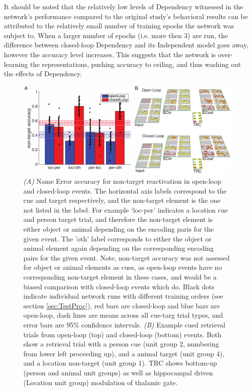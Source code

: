 \documentclass[11pt, titlepage, twoside]{article}
\begin{document}
It should be noted that the relatively low levels of Dependency witnessed in the network's performance compared to the original study's behavioral results %
can be attributed to the relatively small number of training epochs the network was subject to.  When a larger number of epochs (i.e. more then 3) are run, the difference between closed-loop Dependency and its Independent model goes away, however the accuracy level increases.  This suggests that the network is over-learning the representations, pushing accuracy to ceiling, and thus washing out the effects of Dependency.



\begin{figure}
    \begin{center}
	\includegraphics[width=\textwidth]{figs/depNonTarg.pdf}
    \end{center}
      \caption[Non Target Reactivation]{
       \emph{(A)} Name Error accuracy for non-target reactivation in open-loop and closed-loop events.  The horizontal axis labels correspond to the cue and target respectively, and the non-target element is the one not listed in the label.  For example `loc-per' indicates a location cue and person target trial, and therefore the non-target element is either object or animal depending on the encoding paris for the given event.  The 'oth' label corresponds to either the object or animal element again depending on the corresponding encoding pairs for the given event.  Note, non-target accuracy was not assessed for object or animal elements as cues, as open-loop events have no corresponding non-target element in these cases, and would be a biased comparison with closed-loop events which do. Black dots indicate individual network runs with different training orders (see section \ref{sec:TestProc}), red bars are closed-loop and blue bars are open-loop, dash lines are means across all cue-targ trial types, and error bars are 95\% confidence intervals. \emph{(B)} Example cued retrieval trials from open-loop (top) and closed-loop (bottom) events.  Both show a retrieval trial with a person cue (unit group 2, numbering from lower left proceeding up), and a animal target (unit group 4), and a location non-target (unit group 1).  TRC shows bottom-up (person and animal unit groups) as well as hippocampal driven (Location unit group) modulation of thalamic gate.
	}
     \label{fig:netNonTarg}
\end{figure}
\end{document}
